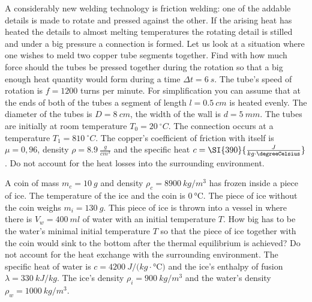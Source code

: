 \documentclass[11pt]{article}
\begin{document}

\probeng
A considerably new welding technology is friction welding: one of the addable details is made to rotate and pressed against the other. If the arising heat has heated the details to almost melting temperatures the rotating detail is stilled and under a big pressure a connection is formed. Let us look at a situation where one wishes to meld two copper tube segments together. Find with how much force should the tubes be pressed together during the rotation so that a big enough heat quantity would form during a time $\Delta t = \SI{6}{s}$. The tube’s speed of rotation is $f = 1200$ turns per minute. For simplification you can assume that at the ends of both of the tubes a segment of length $l
= \SI{0,5}{cm}$ is heated evenly. The diameter of the tubes is $D = \SI{8}{cm}$, the width of the wall is $d = \SI{5}{mm}$. The tubes are initially at room temperature $T_0 = \SI{20}{^\circ C}$. The connection occurs at a temperature $T_1 = \SI{810}{^\circ C}$. The copper’s coefficient of friction with itself is $\mu = 0,96$, density $\rho = \SI{8,9}{\frac{g}{cm^3}}$ and the specific heat $c = \SI{390}{\frac{J}{kg \cdot \degreeCelsius}}$. Do not account for the heat losses into the surrounding environment.
\probend
\bigskip


\probeng
A coin of mass $m_c=\SI{10}{g}$ and density $\rho_c=\SI{8900}{kg/m^3}$ has frozen inside a piece of ice. The temperature of the ice and the coin is $\SI{0}{\degreeCelsius}$. The piece of ice without the coin weighs $m_i=\SI{130}{g}$. This piece of ice is thrown into a vessel in where there is $V_w=\SI{400}{ml}$ of water with an initial temperature $T$. How big has to be the water’s minimal initial temperature $T$ so that the piece of ice together with the coin would sink to the bottom after the thermal equilibrium is achieved? Do not account for the heat exchange with the surrounding environment. The specific heat of water is $c=\SI{4200}{J/ (kg\cdot\degreeCelsius)}$ and the ice’s enthalpy of fusion $\lambda=\SI{330}{kJ/kg}$. The ice’s density $\rho_i=\SI{900}{kg/m^3}$ and the water’s density $\rho_w=\SI{1000}{kg/m^3}$.
\probend
\bigskip

\end{document}

